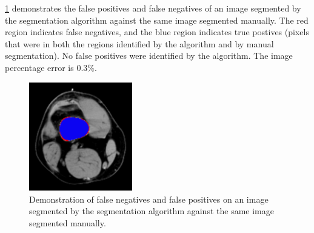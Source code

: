 \documentclass{article}
\begin{document}
		\ref{fig:realError} demonstrates the false positives and false negatives of an image segmented by the segmentation algorithm against the same image segmented manually. The red region indicates false negatives, and the blue region indicates true postives (pixels that were in both the regions identified by the algorithm and by manual segmentation). No false positives were identified by the algorithm. The image percentage error is 0.3\%.

		\begin{figure}[H]
		\centering
		\includegraphics[width=0.4\textwidth]{Mandy/realError.png}
		\caption{Demonstration of false negatives and false positives on an image segmented by the segmentation algorithm against the same image segmented manually.}
		\label{fig:realError}
		\end{figure}
\end{document}
